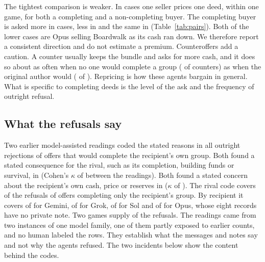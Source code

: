 The tightest comparison is weaker. In  cases one seller prices one deed, within one game, for both a completing and a non-completing buyer. The completing buyer is asked more in  cases, less in  and the same in  (Table~\ref{tab:pairs}). Both of the lower cases are Opus selling Boardwalk as its cash ran down. We therefore report a consistent direction and do not estimate a premium. Counteroffers add a caution. A counter usually keeps the bundle and asks for more cash, and it does so about as often when no one would complete a group ( of  counters) as when the original author would ( of ). Repricing is how these agents bargain in general. What is specific to completing deeds is the level of the ask and the frequency of outright refusal.

\subsection{What the refusals say}

Two earlier model-assisted readings coded the stated reasons in all  outright rejections of offers that would complete the recipient's own group. Both found a stated consequence for the rival, such as its completion, building funds or survival, in  (Cohen's $\kappa$ of  between the readings). Both found a stated concern about the recipient's own cash, price or reserves in  ($\kappa$ of ). The rival code covers  of the  refusals of offers completing only the recipient's group. By recipient it covers  of  for Gemini,  of  for Grok,  of  for Sol and  of  for Opus, whose eight records have no private note. Two games supply  of the  refusals. The readings came from two instances of one model family, one of them partly exposed to earlier counts, and no human labeled the rows. They establish what the messages and notes say and not why the agents refused. The two incidents below show the content behind the codes.

